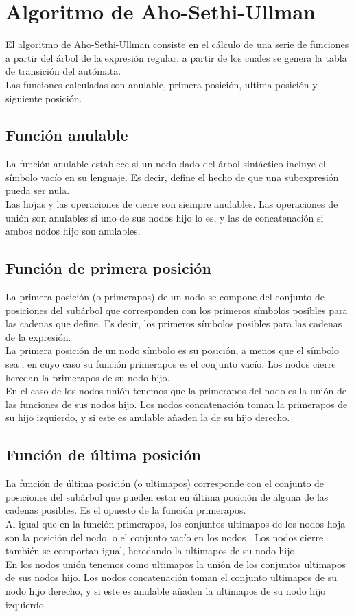 
\section{Algoritmo de Aho-Sethi-Ullman}
El algoritmo de Aho-Sethi-Ullman \cite{dragon} consiste en el cálculo de una serie de funciones a partir del árbol de la expresión regular, a partir de los cuales se genera la tabla de transición del autómata.
\\
Las funciones calculadas son anulable, primera posición, ultima posición y siguiente posición.

\subsection{Función anulable}
La función anulable establece si un nodo dado del árbol sintáctico incluye el símbolo vacío \epsilon en su lenguaje.
Es decir, define el hecho de que una subexpresión pueda ser nula.
\\
Las hojas \epsilon y las operaciones de cierre son siempre anulables.
Las operaciones de unión son anulables si uno de sus nodos hijo lo es, y las de concatenación si ambos nodos hijo son anulables.

\subsection{Función de primera posición}
La primera posición (o primerapos) de un nodo se compone del conjunto de posiciones del subárbol que corresponden con los primeros símbolos posibles para las cadenas que define.
Es decir, los primeros símbolos posibles para las cadenas de la expresión.
\\
La primera posición de un nodo símbolo es su posición, a menos que el símbolo sea \epsilon, en cuyo caso su función primerapos es el conjunto vacío.
Los nodos cierre heredan la primerapos de su nodo hijo.
\\
En el caso de los nodos unión tenemos que la primerapos del nodo es la unión de las funciones de sus nodos hijo.
Los nodos concatenación toman la primerapos de su hijo izquierdo, y si este es anulable añaden la de su hijo derecho.

\subsection{Función de última posición}
La función de última posición (o ultimapos) corresponde con el conjunto de posiciones del subárbol que pueden estar en última posición de alguna de las cadenas posibles.
Es el opuesto de la función primerapos.
\\
Al igual que en la función primerapos, los conjuntos ultimapos de los nodos hoja son la posición del nodo, o el conjunto vacío en los nodos \epsilon.
Los nodos cierre también se comportan igual, heredando la ultimapos de su nodo hijo.
\\
En los nodos unión tenemos como ultimapos la unión de los conjuntos ultimapos de sus nodos hijo.
Los nodos concatenación toman el conjunto ultimapos de su nodo hijo derecho, y si este es anulable añaden la ultimapos de su nodo hijo izquierdo.

